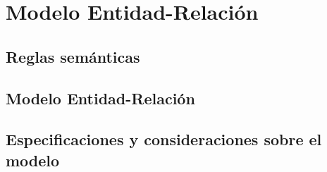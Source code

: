 \section{Modelo Entidad-Relación}

\subsection{Reglas semánticas}


\subsection{Modelo Entidad-Relación}


\subsection{Especificaciones y consideraciones sobre el modelo}